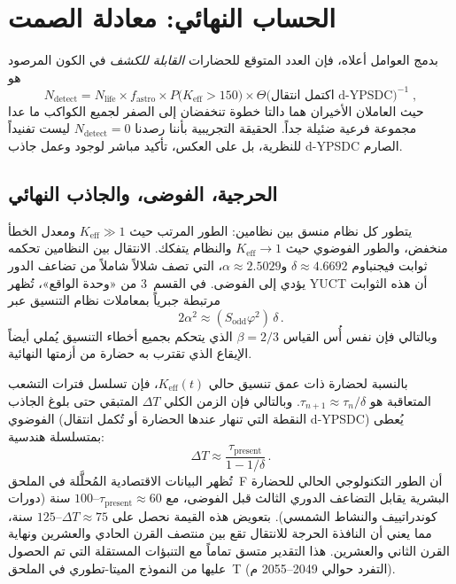 \documentclass[11pt,a4paper]{article}
\newcommand{\Keff}{K_{\mathrm{eff}}}
\begin{document}
	\section{الحساب النهائي: معادلة الصمت}
	\label{sec:final}
	بدمج العوامل أعلاه، فإن العدد المتوقع للحضارات \emph{القابلة للكشف} في الكون المرصود هو
	\begin{equation}
		\label{eq:N_detect}
		N_{\mathrm{detect}} = N_{\mathrm{life}}
		\times f_{\mathrm{astro}}
		\times P\bigl(\Keff > 150\bigr)
		\times \Theta\bigl(\text{اكتمل انتقال d-YPSDC}\bigr)^{-1}\; ,
	\end{equation}
	حيث العاملان الأخيران هما دالتا خطوة تنخفضان إلى الصفر لجميع الكواكب ما عدا مجموعة فرعية ضئيلة جداً. الحقيقة التجريبية بأننا رصدنا \(N_{\mathrm{detect}} = 0\) ليست تفنيداً للنظرية، بل على العكس، تأكيد مباشر لوجود وعمل جاذب d-YPSDC الصارم.
	
	\subsection{الحرجية، الفوضى، والجاذب النهائي}
	\label{sec:chaos}
	
	يتطور كل نظام منسق بين نظامين: الطور المرتب حيث \(K_{\mathrm{eff}} \gg 1\) ومعدل الخطأ منخفض، والطور الفوضوي حيث \(K_{\mathrm{eff}} \to 1\) والنظام يتفكك. الانتقال بين النظامين تحكمه ثوابت فيجنباوم \(\delta \approx 4.6692\) و\(\alpha \approx 2.5029\)، التي تصف شلالاً شاملاً من تضاعف الدور يؤدي إلى الفوضى. في القسم~3 من «وحدة الواقع»، تُظهر YUCT أن هذه الثوابت مرتبطة جبرياً بمعاملات نظام التنسيق عبر
	\begin{equation}
		2\alpha^{2} \approx (S_{\mathrm{odd}}\varphi^{2})\,\delta \, .
	\end{equation}
	وبالتالي فإن نفس أُس القياس \(\beta = 2/3\) الذي يتحكم بجميع أخطاء التنسيق يُملي أيضاً الإيقاع الذي تقترب به حضارة من أزمتها النهائية.
	
	بالنسبة لحضارة ذات عمق تنسيق حالي \(K_{\mathrm{eff}}(t)\)، فإن تسلسل فترات التشعب المتعاقبة هو \(\tau_{n+1} \approx \tau_{n} / \delta\). وبالتالي فإن الزمن الكلي \(\Delta T\) المتبقي حتى بلوغ الجاذب الفوضوي (النقطة التي تنهار عندها الحضارة أو تُكمل انتقال d-YPSDC) يُعطى بمتسلسلة هندسية:
	\begin{equation}
		\Delta T \approx \frac{\tau_{\mathrm{present}}}{1 - 1/\delta} \, .
	\end{equation}
	تُظهر البيانات الاقتصادية المُحلَّلة في الملحق~F أن الطور التكنولوجي الحالي للحضارة البشرية يقابل التضاعف الدوري الثالث قبل الفوضى، مع \(\tau_{\mathrm{present}} \approx 60\)--\(100\) سنة (دورات كوندراتييف والنشاط الشمسي). بتعويض هذه القيمة نحصل على \(\Delta T \approx 75\)--\(125\) سنة، مما يعني أن النافذة الحرجة للانتقال تقع بين منتصف القرن الحادي والعشرين ونهاية القرن الثاني والعشرين. هذا التقدير متسق تماماً مع التنبؤات المستقلة التي تم الحصول عليها من النموذج الميتا-تطوري في الملحق~T (التفرد حوالي 2049--2055 م).
	
\end{document}
